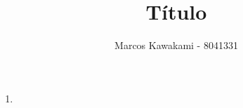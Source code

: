 \documentclass[a4paper]{article}
\title{Título} %
\author{Marcos Kawakami - 8041331} %
\date{} %
\theoremstyle{style}
\theoremstyle{proof}
\begin{document}
\maketitle %


\begin{enumerate}[label=\textbf{\arabic*}.]
\item
\end{enumerate}
\end{document}
